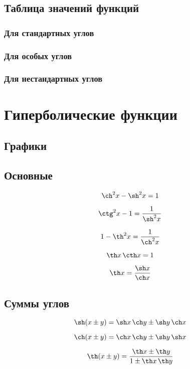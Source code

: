 \subsection{Таблица значений функций}

\subsubsection{Для стандартных углов}

\subsubsection{Для особых углов}

\subsubsection{Для нестандартных углов}


\section{Гиперболические функции}

\subsection{Графики}

\subsection{Основные}

$$ \ch^2 x - \sh^2 x = 1 $$

$$ \ctg^2 x - 1 = \frac{1}{\sh^2 x} $$

$$ 1 - \th^2 x = \frac{1}{\ch^2 x} $$

$$ \th x \, \cth x = 1 $$

$$ \th x = \frac{\sh x}{\ch x} $$

\subsection{Суммы углов}

$$ \sh(x \pm y) = \sh x \, \ch y \pm \sh y \, \ch x $$

$$ \ch(x \pm y) = \ch x \, \ch y \pm \sh y \, \sh x $$

$$ \th(x \pm y) = \frac{\th x \pm \th y}{1 \pm \th x \, \th y} $$

